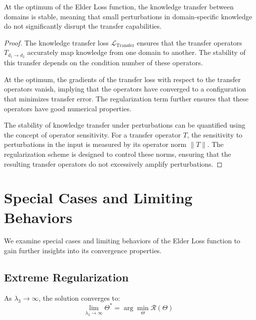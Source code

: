 \begin{theorem}
At the optimum of the Elder Loss function, the knowledge transfer between domains is stable, meaning that small perturbations in domain-specific knowledge do not significantly disrupt the transfer capabilities.
\end{theorem}

\begin{proof}
The knowledge transfer loss $\mathcal{L}_{\text{Transfer}}$ ensures that the transfer operators $T_{d_1 \rightarrow d_2}$ accurately map knowledge from one domain to another. The stability of this transfer depends on the condition number of these operators.

At the optimum, the gradients of the transfer loss with respect to the transfer operators vanish, implying that the operators have converged to a configuration that minimizes transfer error. The regularization term further ensures that these operators have good numerical properties.

The stability of knowledge transfer under perturbations can be quantified using the concept of operator sensitivity. For a transfer operator $T$, the sensitivity to perturbations in the input is measured by its operator norm $\|T\|$. The regularization scheme is designed to control these norms, ensuring that the resulting transfer operators do not excessively amplify perturbations.
\end{proof}

\section{Special Cases and Limiting Behaviors}

We examine special cases and limiting behaviors of the Elder Loss function to gain further insights into its convergence properties.

\subsection{Extreme Regularization}

\begin{theorem}
As $\lambda_3 \to \infty$, the solution converges to:
\begin{equation}
\lim_{\lambda_3 \to \infty} \Theta^* = \arg\min_\Theta \mathcal{R}(\Theta)
\end{equation}
\end{theorem}

